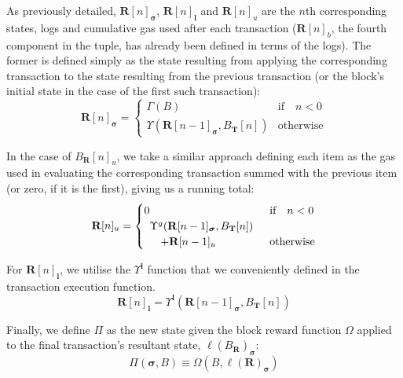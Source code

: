 \documentclass[9pt,oneside]{amsart}
\begin{document}
\begin{multicols}{2}
As previously detailed, $\mathbf{R}[n]_{\boldsymbol{\sigma}}$, $\mathbf{R}[n]_\mathbf{l}$ and $\mathbf{R}[n]_u$ are the $n$th corresponding states, logs and cumulative gas used after each transaction ($\mathbf{R}[n]_b$, the fourth component in the tuple, has already been defined in terms of the logs). The former is defined simply as the state resulting from applying the corresponding transaction to the state resulting from the previous transaction (or the block's initial state in the case of the first such transaction):
\begin{equation}
\mathbf{R}[n]_{\boldsymbol{\sigma}} = \begin{cases} \Gamma(B) & \text{if} \quad n < 0 \\ \Upsilon(\mathbf{R}[n - 1]_{\boldsymbol{\sigma}}, B_\mathbf{T}[n]) & \text{otherwise} \end{cases}
\end{equation}

In the case of $B_\mathbf{R}[n]_u$, we take a similar approach defining each item as the gas used in evaluating the corresponding transaction summed with the previous item (or zero, if it is the first), giving us a running total:
\begin{equation}
\mathbf{R}[n]_u = \begin{cases} 0 & \text{if} \quad n < 0 \\
\begin{array}[b]{l}
\Upsilon^g(\mathbf{R}[n - 1]_{\boldsymbol{\sigma}}, B_\mathbf{T}[n])\\ \quad + \mathbf{R}[n-1]_u
\end{array}
 & \text{otherwise} \end{cases}
\end{equation}

For $\mathbf{R}[n]_\mathbf{l}$, we utilise the $\Upsilon^\mathbf{l}$ function that we conveniently defined in the transaction execution function.
\begin{equation}
\mathbf{R}[n]_\mathbf{l} = 
\Upsilon^\mathbf{l}(\mathbf{R}[n - 1]_{\boldsymbol{\sigma}}, B_\mathbf{T}[n])
\end{equation}

Finally, we define $\Pi$ as the new state given the block reward function $\Omega$ applied to the final transaction's resultant state, $\ell(B_\mathbf{R})_{\boldsymbol{\sigma}}$:
\begin{equation}
\Pi(\boldsymbol{\sigma}, B) \equiv \Omega(B, \ell(\mathbf{R})_{\boldsymbol{\sigma}})
\end{equation}


\end{multicols}
\end{document}
